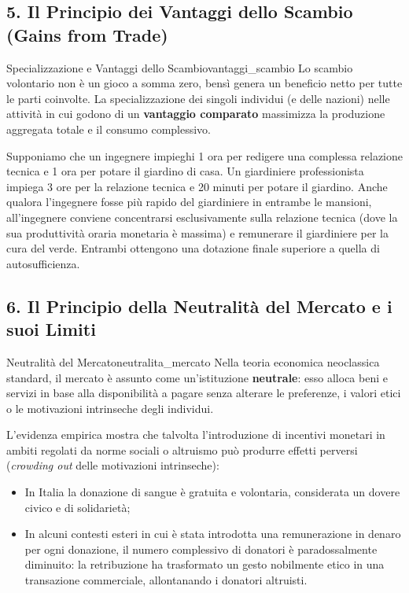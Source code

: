 \subsection{5. Il Principio dei Vantaggi dello Scambio (Gains from Trade)}

\begin{teorema}{Specializzazione e Vantaggi dello Scambio}{vantaggi_scambio}
Lo scambio volontario non è un gioco a somma zero, bensì genera un beneficio netto per tutte le parti coinvolte. La specializzazione dei singoli individui (e delle nazioni) nelle attività in cui godono di un \textbf{vantaggio comparato} massimizza la produzione aggregata totale e il consumo complessivo.
\end{teorema}

\begin{esempio}
Supponiamo che un ingegnere impieghi 1 ora per redigere una complessa relazione tecnica e 1 ora per potare il giardino di casa. Un giardiniere professionista impiega 3 ore per la relazione tecnica e 20 minuti per potare il giardino.
Anche qualora l'ingegnere fosse più rapido del giardiniere in entrambe le mansioni, all'ingegnere conviene concentrarsi esclusivamente sulla relazione tecnica (dove la sua produttività oraria monetaria è massima) e remunerare il giardiniere per la cura del verde. Entrambi ottengono una dotazione finale superiore a quella di autosufficienza.
\end{esempio}

\subsection{6. Il Principio della Neutralità del Mercato e i suoi Limiti}

\begin{definizione}{Neutralità del Mercato}{neutralita_mercato}
Nella teoria economica neoclassica standard, il mercato è assunto come un'istituzione \textbf{neutrale}: esso alloca beni e servizi in base alla disponibilità a pagare senza alterare le preferenze, i valori etici o le motivazioni intrinseche degli individui.
\end{definizione}

\begin{osservazione}
L'evidenza empirica mostra che talvolta l'introduzione di incentivi monetari in ambiti regolati da norme sociali o altruismo può produrre effetti perversi (\textit{crowding out} delle motivazioni intrinseche):
\begin{itemize}
    \item In Italia la donazione di sangue è gratuita e volontaria, considerata un dovere civico e di solidarietà;
    \item In alcuni contesti esteri in cui è stata introdotta una remunerazione in denaro per ogni donazione, il numero complessivo di donatori è paradossalmente diminuito: la retribuzione ha trasformato un gesto nobilmente etico in una transazione commerciale, allontanando i donatori altruisti.
\end{itemize}
\end{osservazione}

